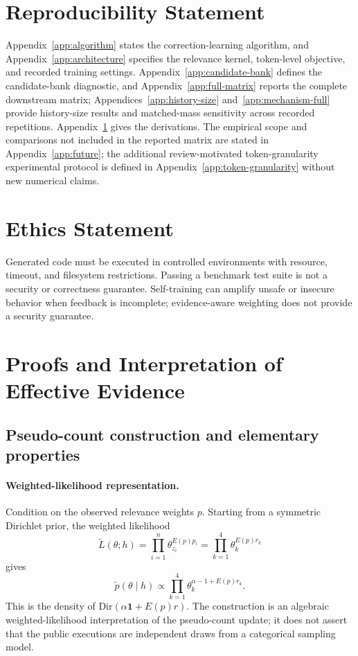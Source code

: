 \documentclass{article}
\begin{document}
\section*{Reproducibility Statement}
Appendix~\ref{app:algorithm} states the correction-learning algorithm, and Appendix~\ref{app:architecture} specifies the relevance kernel, token-level objective, and recorded training settings. Appendix~\ref{app:candidate-bank} defines the candidate-bank diagnostic, and Appendix~\ref{app:full-matrix} reports the complete downstream matrix; Appendices~\ref{app:history-size} and~\ref{app:mechanism-full} provide history-size results and matched-mass sensitivity across recorded repetitions. Appendix~\ref{app:proofs} gives the derivations. The empirical scope and comparisons not included in the reported matrix are stated in Appendix~\ref{app:future}; the additional review-motivated token-granularity experimental protocol is defined in Appendix~\ref{app:token-granularity} without new numerical claims.

\section*{Ethics Statement}
Generated code must be executed in controlled environments with resource, timeout, and filesystem restrictions. Passing a benchmark test suite is not a security or correctness guarantee. Self-training can amplify unsafe or insecure behavior when feedback is incomplete; evidence-aware weighting does not provide a security guarantee.


\clearpage


\clearpage


\appendix

\section{Proofs and Interpretation of Effective Evidence}
\label{app:proofs}

\subsection{Pseudo-count construction and elementary properties}

\paragraph{Weighted-likelihood representation.}
Condition on the observed relevance weights $p$. Starting from a symmetric Dirichlet prior, the weighted likelihood
\begin{equation}
\widetilde L(\theta;h)
=\prod_{i=1}^{n}\theta_{z_i}^{E(p)p_i}
=\prod_{k=1}^{4}\theta_k^{E(p)r_k}
\end{equation}
gives
\begin{equation}
\widetilde p(\theta\mid h)
\propto
\prod_{k=1}^{4}\theta_k^{\alpha-1+E(p)r_k}.
\end{equation}
This is the density of $\mathrm{Dir}(\alpha\mathbf 1+E(p)r)$. The construction is an algebraic weighted-likelihood interpretation of the pseudo-count update; it does not assert that the public executions are independent draws from a categorical sampling model.
\end{document}
